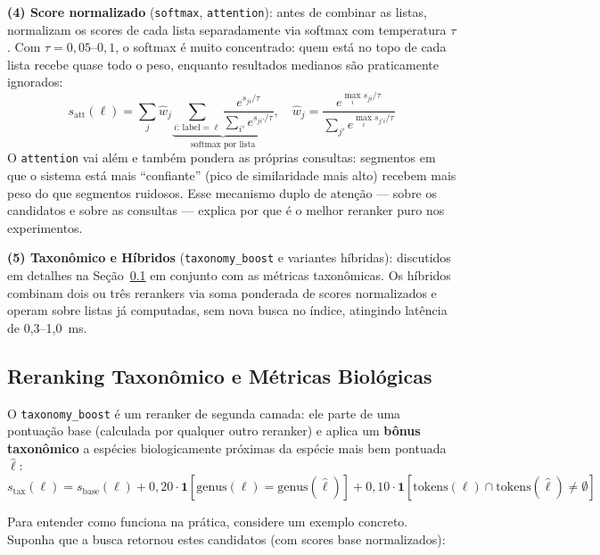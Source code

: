 \documentclass[12pt]{article}
\begin{document}
\textbf{(4) Score normalizado} (\texttt{softmax}, \texttt{attention}): antes
de combinar as listas, normalizam os scores de cada lista separadamente via
softmax com temperatura $\tau$. Com $\tau=0{,}05$--$0{,}1$, o softmax é
muito concentrado: quem está no topo de cada lista recebe quase todo o peso,
enquanto resultados medianos são praticamente ignorados:
\begin{equation}
  s_{\text{att}}(\ell) = \sum_j \hat{w}_j
    \underbrace{\sum_{i:\,\text{label}=\ell}
      \frac{e^{s_{ji}/\tau}}{\sum_{i'} e^{s_{ji'}/\tau}}}_{\text{softmax por lista}},
  \quad
  \hat{w}_j = \frac{e^{\max_i s_{ji}/\tau}}{\sum_{j'} e^{\max_{i} s_{j'i}/\tau}}
  \label{eq:att_rk}
\end{equation}
O \texttt{attention} vai além e também pondera as próprias consultas: segmentos
em que o sistema está mais ``confiante'' (pico de similaridade mais alto)
recebem mais peso do que segmentos ruidosos. Esse mecanismo duplo de atenção
--- sobre os candidatos e sobre as consultas --- explica por que é o melhor
reranker puro nos experimentos.

\textbf{(5) Taxonômico e Híbridos} (\texttt{taxonomy\_boost} e variantes
híbridas): discutidos em detalhes na Seção~\ref{sub:tax} em conjunto com as
métricas taxonômicas. Os híbridos combinam dois ou três rerankers via soma
ponderada de scores normalizados e operam sobre listas já computadas, sem
nova busca no índice, atingindo latência de 0,3--1,0~ms.

\subsection{Reranking Taxonômico e Métricas Biológicas}
\label{sub:tax}

O \texttt{taxonomy\_boost} é um reranker de segunda camada: ele parte de uma
pontuação base (calculada por qualquer outro reranker) e aplica um
\textbf{bônus taxonômico} a espécies biologicamente próximas da espécie
mais bem pontuada $\hat\ell$:
\begin{equation}
  s_{\text{tax}}(\ell) = s_{\text{base}}(\ell)
    + 0{,}20 \cdot \mathbf{1}[\text{genus}(\ell) = \text{genus}(\hat\ell)]
    + 0{,}10 \cdot \mathbf{1}[\text{tokens}(\ell) \cap \text{tokens}(\hat\ell) \neq \emptyset]
  \label{eq:tax}
\end{equation}

Para entender como funciona na prática, considere um exemplo concreto.
Suponha que a busca retornou estes candidatos (com scores base normalizados):
\end{document}
